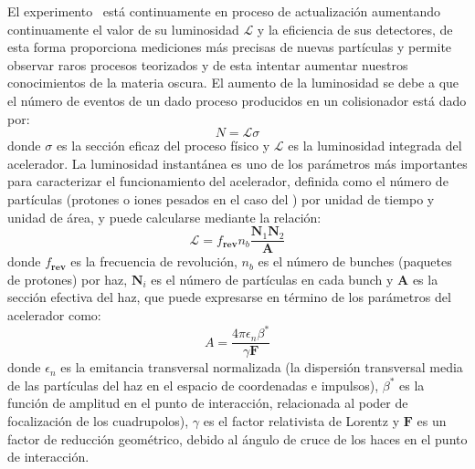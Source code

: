 El experimento \LHC ~está continuamente en proceso de actualización aumentando continuamente el valor de su luminosidad $\mathcal{L}$ y la eficiencia de sus detectores, de esta forma proporciona mediciones más precisas de nuevas partículas y permite observar raros procesos teorizados y de esta intentar aumentar  nuestros conocimientos de la materia oscura. El aumento de la luminosidad se debe a que el número de eventos de un dado proceso producidos en un colisionador está dado por:
\begin{equation}
N = \mathcal{L} \sigma
\end{equation}
donde $\sigma$ es la sección eficaz del proceso físico y $\mathcal{L}$ es la luminosidad integrada del acelerador. La luminosidad instantánea es uno de los parámetros más importantes para caracterizar el funcio­namiento del acelerador, definida como el número de partículas (protones o iones pesados en el caso del \LHC) por unidad de tiempo y unidad de área, y puede calcularse mediante la relación:
\begin{equation}
\mathcal{L} = f_\mathbf{rev} n_b \dfrac{\mathbf{N}_1 \mathbf{N}_2}{\mathbf{A}}
\end{equation}
donde $f_\mathbf{rev}$ es la frecuencia de revolución, $n_b$ es el número de bunches (paquetes de protones) por haz, $\mathbf{N}_i$ es el número de partículas en cada bunch y $\mathbf{A}$ es la sección efectiva del haz, que puede expresarse en término de los parámetros del acelerador como:
\begin{equation}
A = \dfrac{4 \pi \epsilon_n \beta^*}{\gamma \mathbf{F}}
\end{equation}
donde $\epsilon_n$ es la emitancia transversal normalizada (la dispersión transversal media de las partículas del haz en el espacio de coordenadas e impulsos), $\beta^*$ es la función de amplitud en el punto de interacción, relacionada al poder de focalización de los cuadrupolos), $\gamma$ es el factor relativista de Lorentz y $\mathbf{F}$ es un factor de reducción geométrico, debido al ángulo de cruce de los haces en el punto de interacción.




